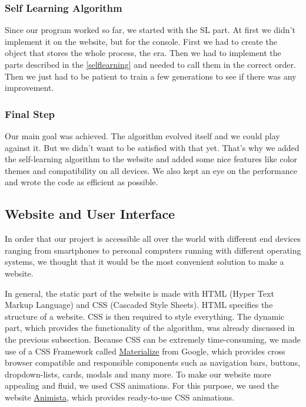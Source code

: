 \subsubsection{Self Learning Algorithm}
Since our program worked so far, we started with the \ac{SL} part. At first we didn't implement it on the website, but for the console. First we had to create the object that stores the whole process, the era. Then we had to implement the parts described in the \autoref{selflearning} and needed to call them in the correct order. Then we just had to be patient to train a few generations to see if there was any improvement.



\subsubsection{Final Step}
Our main goal was achieved. The algorithm evolved itself and we could play against it. But we didn't want to be satisfied with that yet. That's why we added the self-learning algorithm to the website and added some nice features like color themes and compatibility on all devices. We also kept an eye on the performance and wrote the code as efficient as possible.

\subsection{Website and User Interface} \label{websiteui}
In order that our project is accessible all over the world with different end devices ranging from smartphones to personal computers running with different operating systems, we thought that it would be the most convenient solution to make a website.

In general, the static part of the website is made with HTML (Hyper Text Markup Language) and CSS (Cascaded Style Sheets). HTML specifies the structure of a website.  CSS is then required to style everything. The dynamic part, which provides the functionality of the algorithm, was already discussed in the previous subsection. 
Because CSS can be extremely time-consuming, we made use of a CSS Framework called \href{https://materializecss.com/}{Materialize} from Google, which provides cross browser compatible and responsible components such as navigation bars, buttons, dropdown-lists, cards, modals and many more. To make our website more appealing and fluid, we used CSS animations. For this purpose, we used the website \href{http://animista.net/}{Animista}, which provides ready-to-use CSS animations.

